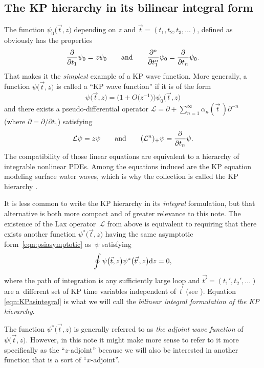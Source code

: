 \documentclass[10pt,a4paper]{amsart}
\numberwithin{equation}{section}
\theoremstyle{definition}
\def\vt{\vec{t}}
\def\vtp{\vec{t'}}
\begin{document}
\subsection{The KP hierarchy in its bilinear integral form}
The function $\psi_0\bigl(\vt,z\bigr)$ depending on $z$ and
$\vt=(t_1,t_2,t_3,\ldots)$, defined as
\smash{$
\psi_0\bigl(\vt,z\bigr)={\rm e}^{\sum t_i z^i}
$}
obviously has the properties
\[
\frac{\partial}{\partial t_1}\psi_0=z\psi_0\qquad\hbox{and}\qquad
\frac{\partial^n}{\partial t_1^n}\psi_0=\frac{\partial}{\partial
 t_n}\psi_0.
\]
That makes it the \textit{simplest} example of a KP wave function.
More generally, a function $\psi\bigl(\vt,z\bigr)$
is called a ``KP wave function'' if it is of the form
\begin{equation}
\psi\bigl(\vt,z\bigr)=\bigl(1+O\bigl(z^{-1}\bigr)\bigr)\psi_0\bigl(\vt,z\bigr)\label{eqn:psiasymptotic}
\end{equation}
and there exists a pseudo-differential operator
$\mathcal{L}=\partial+\sum_{n=1}^{\infty}\alpha_n(\vt\,)\partial^{-n}$
(where $\partial=\partial/\partial t_1$) satisfying
\[
\mathcal{L}\psi=z\psi\qquad\hbox{and}\qquad(\mathcal{L}^n)_+\psi=\frac{\partial}{\partial
t_n}\psi.
\]
The
compatibility of those linear equations are equivalent to a hierarchy of integrable nonlinear PDEs.
Among the equations induced are the KP equation modeling surface water
waves, which is why the collection is called the KP hierarchy \cite{GOST,Sato,SegalWilson}.

It is less common to write the KP
hierarchy in its \textit{integral} formulation, but that alternative
is both more compact and of greater relevance to this note. The
existence of the Lax operator~$\mathcal{L}$ from above is equivalent
to requiring that
there exists another function $\psi^*\bigl(\vt,z\bigr)$ having the same
asymptotic form~\eqref{eqn:psiasymptotic} as~$\psi$
satisfying
\begin{equation}
\oint \psi\bigl(\vt,z\bigr)\psi^*\bigl(\vtp,z\bigr){\rm d}z=0,\label{eqn:KPasintegral}
\end{equation}
where the path of integration is any sufficiently large loop and
 $\vtp=(t_1',t_2',\ldots)$ are a~different set of KP time variables
 independent of $\vt$
 (see \cite{DateJimboKashMiwaI,DateJimboKashMiwaIII,DateJimboKashMiwaIV,DateJimboKashMiwaV,DateJimboKashMiwaVI,DateJimboKashMiwaVII}). Equation \eqref{eqn:KPasintegral} is what we will call the
\textit{bilinear integral formulation of the KP hierarchy}.


The function
$\psi^*\bigl(\vt,z\bigr)$ is generally referred to as \textit{the adjoint wave
 function} of $\psi\bigl(\vt,z\bigr)$. However, in this note it might make
more sense to refer to it more specifically as the ``$z$-adjoint'' because
we will also be interested in another function that is a sort of
``$x$-adjoint''.
\end{document}
